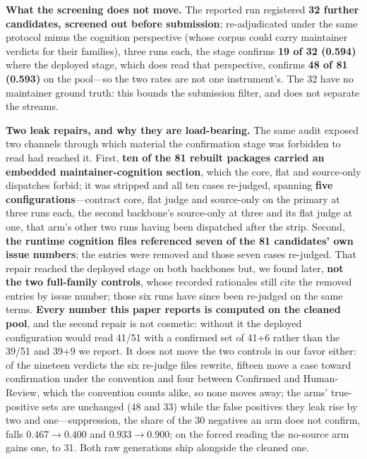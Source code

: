 \documentclass[acmsmall,screen,review,anonymous]{acmart}
\begin{document}
\textbf{What the screening does not move.} The reported run registered \textbf{32 further candidates,
screened out before submission}; re-adjudicated under the same protocol minus the cognition
perspective (whose corpus could carry maintainer verdicts for their families), three runs each, the
stage confirms \textbf{19 of 32 (0.594)} where the deployed stage, which does read that perspective,
confirms \textbf{48 of 81 (0.593)} on the pool---so the two rates are not one instrument's. The 32
have no maintainer ground truth: this bounds the submission filter, and does not separate the
streams.

\textbf{Two leak repairs, and why they are load-bearing.} The same audit
exposed two channels through which material the confirmation stage was forbidden to read had reached
it. First, \textbf{ten of the 81 rebuilt packages carried an embedded maintainer-cognition
section}, which the core, flat and source-only dispatches forbid; it was stripped and all ten cases
re-judged, spanning \textbf{five configurations}---contract core, flat judge and source-only on the
primary at three runs each, the second backbone's source-only at three and its flat judge at one,
that arm's other two runs having been dispatched after the strip. Second, \textbf{the runtime
cognition files referenced seven of the 81 candidates' own issue numbers}; the entries were removed
and those seven cases re-judged. That repair reached the deployed stage on both backbones but, we
found later, \textbf{not the two full-family controls}, whose recorded rationales still cite the
removed entries by issue number; those six runs have since been re-judged on the same terms.
\textbf{Every number this paper reports is computed on the cleaned pool}, and the second repair is
not cosmetic: without it the deployed configuration would read 41/51 with a confirmed set of 41+6
rather than the 39/51 and 39+9 we report. It does not move the two controls in our favor either: of
the nineteen verdicts the six re-judge files rewrite, fifteen move a case toward confirmation under
the convention and four between Confirmed and Human-Review, which the convention counts alike, so
none moves away; the arms' true-positive sets are unchanged (48 and 33) while the false positives
they leak rise by two and one---suppression, the share of the 30 negatives an arm does not confirm,
falls $0.467\to0.400$ and $0.933\to0.900$; on the forced reading the no-source arm gains one, to 31.
Both raw generations ship alongside the cleaned one.
\end{document}
